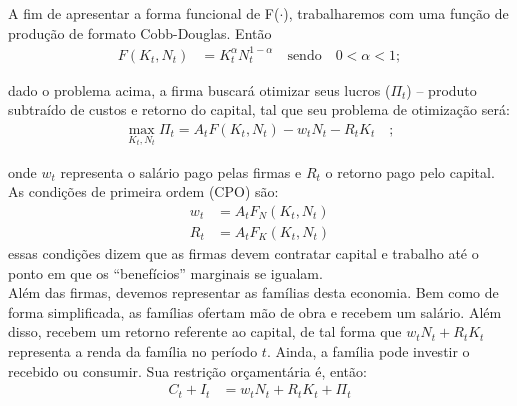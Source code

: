 \documentclass[11pt,a4paper]{article}
\begin{document}
A fim de apresentar a forma funcional de F($\cdot$), trabalharemos com uma função de produção de formato Cobb-Douglas. Então
\begin{align}
F(K_t, N_t) &= K_t^{\alpha} N_t^{1-\alpha} \quad \text{sendo} \quad 0 < \alpha < 1; 
\end{align}

\noindent
dado o problema acima, a firma buscará otimizar seus lucros ($\Pi_t$) -- produto subtraído de custos e retorno do capital, tal que seu problema de otimização será:
\begin{align}
\max_{K_t, N_t} \Pi_t = A_t F(K_t, N_t) - w_t N_t - R_t K_t \quad ;
\end{align}

\noindent
onde $w_t$ representa o salário pago pelas firmas e $R_t$ o retorno pago pelo capital. As condições de primeira ordem (CPO) são:
\begin{align}
w_t &= A_t F_N(K_t, N_t) \\
R_t &= A_t F_K(K_t, N_t)
\end{align}
\noindent
essas condições dizem que as firmas devem contratar capital e trabalho até o ponto em que os ``benefícios'' marginais se igualam.\\

Além das firmas, devemos representar as famílias desta economia. Bem como de forma simplificada, as famílias ofertam mão de obra e recebem um salário. Além disso, recebem um retorno referente ao capital, de tal forma que $w_t N_t + R_t K_t$ representa a renda da família no período $t$. Ainda, a família pode investir o recebido ou consumir. Sua restrição orçamentária é, então:
\begin{align} \label{eq:restr}
C_t + I_t &= w_t N_t + R_t K_t + \Pi_t
\end{align}
\end{document}
